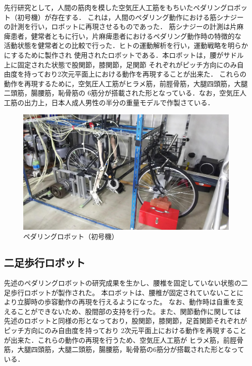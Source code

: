 先行研究として，人間の筋肉を模した空気圧人工筋をもちいたペダリングロボット（初号機）が存在する．
これは，人間のペダリング動作における筋シナジーの計測を行い，ロボットに再現させるものであった．
筋シナジーの計測は片麻痺患者，健常者ともに行い，片麻痺患者におけるペダリング動作時の特徴的な
活動状態を健常者との比較で行った．ヒトの運動解析を行い，運動戦略を明らかにするために製作され
使用されたロボットである．本ロボットは，腰がサドル上に固定された状態で股関節，膝関節，足関節
それぞれがピッチ方向にのみ自由度を持っており2次元平面上における動作を再現することが出来た．
これらの動作を再現するために，空気圧人工筋がヒラメ筋，前脛骨筋，大腿四頭筋，大腿二頭筋，腸腰筋，恥骨筋の
6筋分が搭載された形となっている．なお，空気圧人工筋の出力上，日本人成人男性の半分の重量モデルで作製さている．%
\begin{figure}[h]
 \begin{center}
  \includegraphics[width=0.75\columnwidth,clip]{./1_prolusion/1st.eps}
  \caption{ペダリングロボット（初号機）}
  \label{初号機}
  \end{center} %
\end{figure}

\newpage

\subsection{二足歩行ロボット}
先述のペダリングロボットの研究成果を生かし、腰椎を固定していない状態の二足歩行ロボットが製作された。
本ロボットは、腰椎が固定されていないことにより立脚時の歩容動作の再現を行えるようになった。
なお、動作時は自重を支えることができないため、股間部の支持を行った。また、関節動作に関しては
先述のロボットと同様の形となっており，股関節，膝関節，足首関節それぞれがピッチ方向にのみ自由度を持っており
2次元平面上における動作を再現することが出来た．これらの動作の再現を行うため、空気圧人工筋が
ヒラメ筋，前脛骨筋，大腿四頭筋，大腿二頭筋，腸腰筋，恥骨筋の6筋分が搭載された形となっている．

